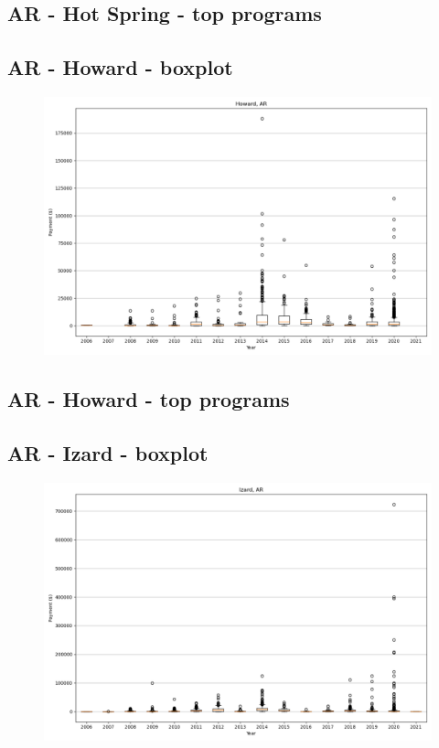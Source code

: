 \subsection*{AR - Hot Spring - top programs}

\newpage
\subsection*{AR - Howard - boxplot}
\begin{figure}[h]
\centering
\includegraphics[width=7in]{../output/boxplots/counties/Howard-AR_boxplot.png}
\end{figure}


\subsection*{AR - Howard - top programs}

\newpage
\subsection*{AR - Izard - boxplot}
\begin{figure}[h]
\centering
\includegraphics[width=7in]{../output/boxplots/counties/Izard-AR_boxplot.png}
\end{figure}


